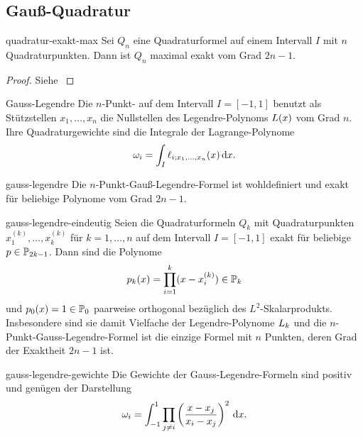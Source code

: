 \subsection{Gauß-Quadratur}

\begin{Lemma}{quadratur-exakt-max}
  Sei $Q_n$ eine Quadraturformel auf einem Intervall $I$ mit $n$
  Quadraturpunkten. Dann ist $Q_n$ maximal exakt vom Grad $2n-1$.
\end{Lemma}

\begin{proof}
  Siehe \cite[Satz 3.1]{Rannacher17}
\end{proof}

\begin{Definition}{Gauss-Legendre}
  Die $n$-Punkt- auf dem Intervall
  $I=[-1,1]$ benutzt als Stützstellen $x_1,\dots,x_n$ die Nullstellen
  des Legendre-Polynoms $\plegendre(x)$ vom Grad $n$. Ihre
  Quadraturgewichte sind die Integrale der Lagrange-Polynome
  \begin{gather}
    \omega_i = \int_I \plagrange_{i;x_1,\dots,x_n}(x)\dx.
  \end{gather}
\end{Definition}

\begin{Satz}{gauss-legendre}
  Die $n$-Punkt-Gauß-Legendre-Formel ist wohldefiniert und exakt für
  beliebige Polynome vom Grad $2n-1$.
\end{Satz}

\begin{Satz}{gauss-legendre-eindeutig}
  Seien die Quadraturformeln $Q_k$ mit Quadraturpunkten
  $x_1^{(k)},\dots,x_k^{(k)}$ für $k=1,\dots,n$ auf dem Intervall
  $I=[-1,1]$ exakt für beliebige $p\in \P_{2k-1}$. Dann sind die
  Polynome
  \begin{gather}
    p_k(x) = \prod_{i=1}^k (x-x_i^{(k)}) \in \P_k
  \end{gather}
  und $p_0(x) = 1 \in \P_0$ paarweise orthogonal bezüglich des
  $L^2$-Skalarprodukts. Insbesondere sind sie damit Vielfache der
  Legendre-Polynome $\plegendre_k$ und die
  $n$-Punkt-Gauss-Legendre-Formel ist die einzige Formel mit $n$
  Punkten, deren Grad der Exaktheit $2n-1$ ist.
\end{Satz}

\begin{Lemma}{gauss-legendre-gewichte}
  Die Gewichte der Gauss-Legendre-Formeln sind positiv und genügen der
  Darstellung
  \begin{gather}
    \omega_i = \int_{-1}^1 \prod_{j\neq i}
    \left(\frac{x-x_j}{x_i-x_j}\right)^2\dx.
  \end{gather}
\end{Lemma}

